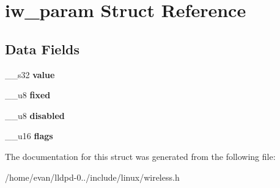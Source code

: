 \section{iw\-\_\-param \-Struct \-Reference}
\label{structiw__param}
\subsection*{\-Data \-Fields}
\begin{DoxyCompactItemize}
\item 
\-\_\-\-\_\-s32 {\bfseries value}\label{structiw__param_a2cf90f9279f9abbfe8fccc87e575e561}

\item 
\-\_\-\-\_\-u8 {\bfseries fixed}\label{structiw__param_af1d0eb8d55a2f96df6746da00f3061b8}

\item 
\-\_\-\-\_\-u8 {\bfseries disabled}\label{structiw__param_a5150d389bcc9b43e595bc72c311d3b79}

\item 
\-\_\-\-\_\-u16 {\bfseries flags}\label{structiw__param_a9002b95db69f77b589a07d05560621ca}

\end{DoxyCompactItemize}


\-The documentation for this struct was generated from the following file\-:\begin{DoxyCompactItemize}
\item 
/home/evan/lldpd-\/0../include/linux/wireless.\-h\end{DoxyCompactItemize}
